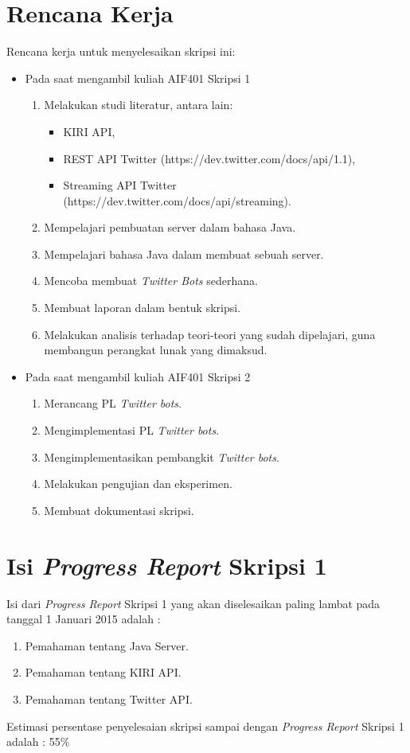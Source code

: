 \documentclass[a4paper,twoside]{article}
\begin{document}
\section{Rencana Kerja}
Rencana kerja untuk menyelesaikan skripsi ini:
\begin{itemize}
	\item Pada saat mengambil kuliah AIF401 Skripsi 1
	\begin{enumerate}
		\item Melakukan studi literatur, antara lain:
		\begin{itemize}
			\item KIRI API,
			\item REST API Twitter (https://dev.twitter.com/docs/api/1.1),
			\item Streaming API Twitter (https://dev.twitter.com/docs/api/streaming).
		\end{itemize}
		\item Mempelajari pembuatan server dalam bahasa Java.
		\item Mempelajari bahasa Java dalam membuat sebuah server.
		\item Mencoba membuat \textit{Twitter Bots} sederhana.
		\item Membuat laporan dalam bentuk skripsi.
		\item Melakukan analisis terhadap teori-teori yang sudah dipelajari, guna membangun perangkat lunak yang dimaksud.
	\end{enumerate}
	\item Pada saat mengambil kuliah AIF401 Skripsi 2
	\begin{enumerate}
		\item Merancang PL \textit{Twitter bots}.
		\item Mengimplementasi PL \textit{Twitter bots}.
		\item Mengimplementasikan pembangkit \textit{Twitter bots}. 
		\item Melakukan pengujian dan eksperimen.
		\item Membuat dokumentasi skripsi.
	\end{enumerate}
\end{itemize}

\section{Isi {\it Progress Report} Skripsi 1}
Isi dari {\it Progress Report} Skripsi 1 yang akan diselesaikan paling lambat pada tanggal 1 Januari 2015 adalah :
\begin{enumerate}
	\item Pemahaman tentang Java Server.
	\item Pemahaman tentang KIRI API.
	\item Pemahaman tentang Twitter API.
\end{enumerate}
Estimasi persentase penyelesaian skripsi sampai dengan {\it Progress Report} Skripsi 1 adalah : 55\%
\vspace{1.5cm}
\end{document}
